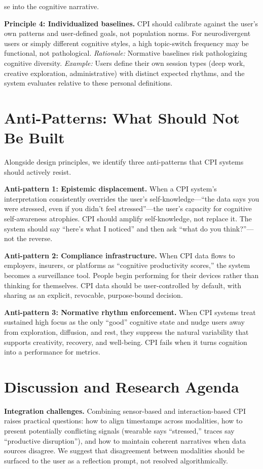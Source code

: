 se into the cognitive narrative.

\textbf{Principle 4: Individualized baselines.} CPI should calibrate against the user's own patterns and user-defined goals, not population norms. For neurodivergent users or simply different cognitive styles, a high topic-switch frequency may be functional, not pathological. \textit{Rationale:} Normative baselines risk pathologizing cognitive diversity. \textit{Example:} Users define their own session types (deep work, creative exploration, administrative) with distinct expected rhythms, and the system evaluates relative to these personal definitions.

\section{Anti-Patterns: What Should Not Be Built}

Alongside design principles, we identify three anti-patterns that CPI systems should actively resist.

\textbf{Anti-pattern 1: Epistemic displacement.} When a CPI system's interpretation consistently overrides the user's self-knowledge---``the data says you were stressed, even if you didn't feel stressed''---the user's capacity for cognitive self-awareness atrophies. CPI should amplify self-knowledge, not replace it. The system should say ``here's what I noticed'' and then ask ``what do you think?''---not the reverse.

\textbf{Anti-pattern 2: Compliance infrastructure.} When CPI data flows to employers, insurers, or platforms as ``cognitive productivity scores,'' the system becomes a surveillance tool. People begin performing for their devices rather than thinking for themselves. CPI data should be user-controlled by default, with sharing as an explicit, revocable, purpose-bound decision.

\textbf{Anti-pattern 3: Normative rhythm enforcement.} When CPI systems treat sustained high focus as the only ``good'' cognitive state and nudge users away from exploration, diffusion, and rest, they suppress the natural variability that supports creativity, recovery, and well-being. CPI fails when it turns cognition into a performance for metrics.

\section{Discussion and Research Agenda}

\textbf{Integration challenges.} Combining sensor-based and interaction-based CPI raises practical questions: how to align timestamps across modalities, how to present potentially conflicting signals (wearable says ``stressed,'' traces say ``productive disruption''), and how to maintain coherent narratives when data sources disagree. We suggest that disagreement between modalities should be surfaced to the user as a reflection prompt, not resolved algorithmically.

